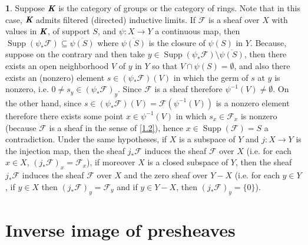 \documentclass[12pt]{amsart}
\newcommand{\Supp}{\operatorname{Supp}}
\theoremstyle{definition}
\newtheorem{bk}[proposition]{}
\begin{document}
\begin{bk}\label{I: 3.4.6} Suppose $\emph{\textbf{K}}$ is the category of groups or the category of rings. Note that in this case, $\emph{\textbf{K}}$ admits filtered (directed) inductive limits.  If $\mathscr{F}$ is a sheaf over $X$ with values in $\emph{\textbf{K}}$, of support $S$, and $\psi:X\rightarrow Y$ a continuous map, then $\Supp(\psi_{\ast}\mathscr{F})\subseteq\overline{\psi(S)}$ where $\overline{\psi(S)}$ is the closure of $\psi(S)$ in $Y$. Because, suppose on the contrary and then take $y\in\Supp(\psi_{\ast}\mathscr{F})\setminus\overline{\psi(S)}$, then there exists an open neighborhood $V$ of $y$ in $Y$ so that $V\cap\psi(S)=\emptyset$, and also there exists an (nonzero) element $s\in(\psi_{\ast}\mathscr{F})(V)$ in which the germ of $s$ at $y$ is nonzero, i.e. $0\neq s_{y}\in(\psi_{\ast}\mathscr{F})_{y}$. Since $\mathscr{F}$ is a sheaf therefore $\psi^{-1}(V)\neq\emptyset$. On the other hand, since $s\in(\psi_{\ast}\mathscr{F})(V)=\mathscr{F}(\psi^{-1}(V))$ is a nonzero element therefore there exists some point $x\in\psi^{-1}(V)$ in which $s_{x}\in\mathscr{F}_{x}$ is nonzero (because $\mathscr{F}$ is a sheaf in the sense of \ref{1.2}), hence $x\in\Supp(\mathscr{F})=S$ a contradiction.
Under the same hypotheses, if $X$ is a subspace of $Y$ and $j:X\rightarrow Y$ is the injection map, then the sheaf $j_{\ast}\mathscr{F}$ induces the sheaf $\mathscr{F}$ over $X$ (i.e. for each $x\in X$, $(j_{\ast}\mathscr{F})_{x}=\mathscr{F}_{x}$), if moreover $X$ is a closed subspace of $Y$, then the sheaf $j_{\ast}\mathscr{F}$ induces the sheaf $\mathscr{F}$ over $X$ and the zero sheaf over $Y-X$ (i.e. for each $y\in Y$, if $y\in X$ then $(j_{\ast}\mathscr{F})_{y}=\mathscr{F}_{y}$ and if $y\in Y-X$, then $(j_{\ast}\mathscr{F})_{y}=\{0\}$).

\end{bk}

\section{Inverse image of presheaves}
\end{document}
